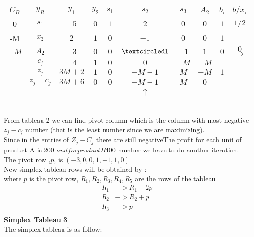 \documentclass[12pt,a4paper]{article}
\begin{document}
		\begin{tabular}{cc|cccccc|cc}
			\hline 
			$C_B$& $y_B $&$ y_1$ & $y_2$ & $s_1$ & $s_2$ & $s_3$ & $A_2$ & $b_i$ & $b/x_i$ \\ 
			\hline 
			0  &  $s_1$ & $-5$ & $0$ & $1$ & $2$ & $0$ & $0$  &$1$ & $1/2$\\ 
			-M &  $x_2$ & $2$ & $1$ & $0$ & $-1$  & $0$ & $0$ & $1$& $-$\\ 
			$-M$ &  $A_2$ & $-3$ & $0$ & $0$ & $\textcircled1$ & $-1$ & $1$ &  $0$ & $0$ $\rightarrow$\\ 
			\hline 
			& $ c_j$ & $-4$ & $1$ & $0$ & $0$  & $-M$ & $-M$ &  & \\ 
			\hline
			& $ z_j$ & $3M+2$ & $1$ & $0$ & $-M-1$ & $M$ & $-M$ & $1$ & \\ 
			\hline 
			&  $z_j-c_j$& $3M+6$ & $0$ & $0$  & $-M-1$ & $M$ & $0$ &  &\\ 
			\hline 
			&  &  &  &  & $\uparrow$ &  &  &  &   \\ 
		\end{tabular} \\
		From tableau 2 we can find pivot column which is the column with most negative $z_j-c_j$ number (that is the least number since we are maximizing). \\
		Since in the entries of $Z_j-C_j$ there are still negativeThe profit for each unit of product A is 200 $ and for product B 400 $ number we have to do another iteration.
		The pivot row ,$p$, is $( -3,0,0,1, -1 , 1 , 0)$\\
		New simplex tableau rows will be obtained by :\\
		where $p$ is the pivot row, $R_1,R_2,R_3,R_4,R_5$ are the rows of the tableau
		\begin{align*}
		R_1 &-> R_1-2p\\
		R_2 &-> R_2+p\\
		R_3 &-> p\\
		\end{align*}
		\textbf{\underline{Simplex Tableau 3}}\\
		The simplex tableau is as follow: \\
		
\end{document}
